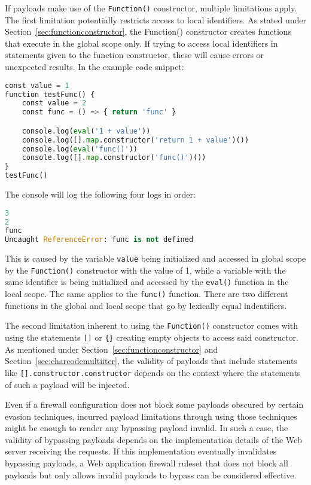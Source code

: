 If payloads make use of the \verb|Function()| constructor, multiple limitations apply. The first limitation potentially restricts access to local identifiers. As stated under Section~\ref{sec:functionconstructor}, the Function() constructor creates functions that execute in the global scope only. If trying to access local identifiers in statements given to the function constructor, these will cause errors or unexpected results. In the example code snippet:

\begin{lstlisting}[style=basicStyle, language=Python]
const value = 1
function testFunc() {
	const value = 2
	const func = () => { return 'func' }

	console.log(eval('1 + value'))
	console.log([].map.constructor('return 1 + value')())
	console.log(eval('func()'))
	console.log([].map.constructor('func()')())
}
testFunc()
\end{lstlisting}

The console will log the following four logs in order:

\begin{lstlisting}[style=basicStyle, language=Python]
3 
2 
func 
Uncaught ReferenceError: func is not defined
\end{lstlisting}

This is caused by the variable \verb|value| being initialized and accessed in global scope by the \verb|Function()| constructor with the value of 1, while a variable with the same identifier is being initialized and accessed by the \verb|eval()| function in the local scope. The same applies to the \verb|func()| function. There are two different functions in the global and local scope that go by lexically equal indentifiers.

The second limitation inherent to using the \verb|Function()| constructor comes with using the statements \verb|[]| or \verb|{}| creating empty objects to access said constructor. As mentioned under Section~\ref{sec:functionconstructor} and Section~\ref{sec:charcodemultiiter}, the validity of payloads that include statements like \verb|[].constructor.constructor| depends on the context where the statements of such a payload will be injected. 


Even if a firewall configuration does not block some payloads obscured by certain evasion techniques, incurred payload limitations through using those techniques might be enough to render any bypassing payload invalid. In such a case, the validity of bypassing payloads depends on the implementation details of the Web server receiving the requests. If this implementation eventually invalidates bypassing payloads, a Web application firewall ruleset that does not block all payloads but only allows invalid payloads to bypass can be considered effective.
